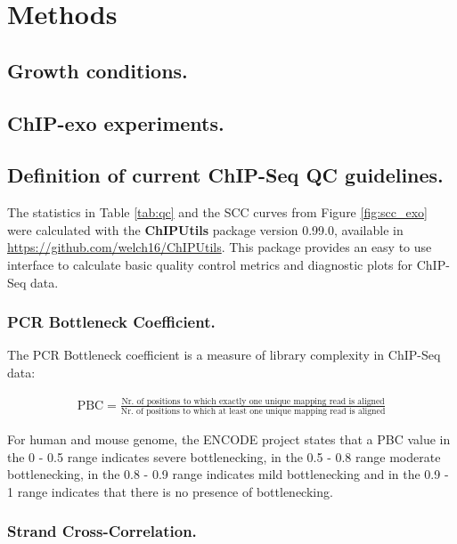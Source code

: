 \documentclass{bmcart}\usepackage[]{graphicx}\usepackage[]{color}
\begin{document}
\section{Methods}
\label{sec:methods}



\subsection*{Growth conditions.}


\subsection*{ChIP-exo experiments.}


\subsection*{Definition of current ChIP-Seq QC guidelines.}

The statistics in Table \ref{tab:qc} and the SCC curves from Figure
\ref{fig:scc_exo} were calculated with the \textbf{ChIPUtils} package
version 0.99.0, available in
\url{https://github.com/welch16/ChIPUtils}. This package provides an
easy to use interface to calculate basic quality control metrics and
diagnostic plots for ChIP-Seq data.

\subsubsection*{PCR Bottleneck Coefficient.}

The PCR Bottleneck coefficient is a measure of library complexity in
ChIP-Seq data:

\begin{align}
  \mbox{PBC} = \frac{\text{Nr. of positions to which exactly one
      unique mapping read is aligned}}{\text{Nr. of positions to
      which at least one unique mapping read is aligned}} \nonumber
\end{align}

For human and mouse genome, the ENCODE project states that a PBC value
in the 0 - 0.5 range indicates severe bottlenecking, in the 0.5 - 0.8
range moderate bottlenecking, in the 0.8 - 0.9 range indicates mild
bottlenecking and in the 0.9 - 1 range indicates that there is no
presence of bottlenecking.

\subsubsection*{Strand Cross-Correlation.}
\end{document}
